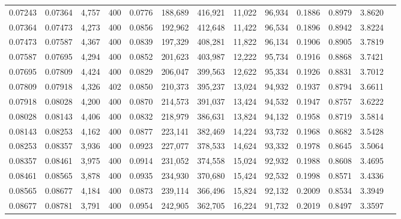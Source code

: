 \begin{tabular}{rrrrrrrrrrrrr}
0.07243 & 0.07364 &  4,757 & 400 &                                     0.0776 & 188,689 & 416,921 &  11,022 &  96,934 & 0.1886 & 0.8979 & 3.8620 \\
0.07364 & 0.07473 &  4,273 & 400 &                                     0.0856 & 192,962 & 412,648 &  11,422 &  96,534 & 0.1896 & 0.8942 & 3.8224 \\
0.07473 & 0.07587 &  4,367 & 400 &                                     0.0839 & 197,329 & 408,281 &  11,822 &  96,134 & 0.1906 & 0.8905 & 3.7819 \\
0.07587 & 0.07695 &  4,294 & 400 &                                     0.0852 & 201,623 & 403,987 &  12,222 &  95,734 & 0.1916 & 0.8868 & 3.7421 \\
0.07695 & 0.07809 &  4,424 & 400 &                                     0.0829 & 206,047 & 399,563 &  12,622 &  95,334 & 0.1926 & 0.8831 & 3.7012 \\
0.07809 & 0.07918 &  4,326 & 402 &                                     0.0850 & 210,373 & 395,237 &  13,024 &  94,932 & 0.1937 & 0.8794 & 3.6611 \\
0.07918 & 0.08028 &  4,200 & 400 &                                     0.0870 & 214,573 & 391,037 &  13,424 &  94,532 & 0.1947 & 0.8757 & 3.6222 \\
0.08028 & 0.08143 &  4,406 & 400 &                                     0.0832 & 218,979 & 386,631 &  13,824 &  94,132 & 0.1958 & 0.8719 & 3.5814 \\
0.08143 & 0.08253 &  4,162 & 400 &                                     0.0877 & 223,141 & 382,469 &  14,224 &  93,732 & 0.1968 & 0.8682 & 3.5428 \\
0.08253 & 0.08357 &  3,936 & 400 &                                     0.0923 & 227,077 & 378,533 &  14,624 &  93,332 & 0.1978 & 0.8645 & 3.5064 \\
0.08357 & 0.08461 &  3,975 & 400 &                                     0.0914 & 231,052 & 374,558 &  15,024 &  92,932 & 0.1988 & 0.8608 & 3.4695 \\
0.08461 & 0.08565 &  3,878 & 400 &                                     0.0935 & 234,930 & 370,680 &  15,424 &  92,532 & 0.1998 & 0.8571 & 3.4336 \\
0.08565 & 0.08677 &  4,184 & 400 &                                     0.0873 & 239,114 & 366,496 &  15,824 &  92,132 & 0.2009 & 0.8534 & 3.3949 \\
0.08677 & 0.08781 &  3,791 & 400 &                                     0.0954 & 242,905 & 362,705 &  16,224 &  91,732 & 0.2019 & 0.8497 & 3.3597 \\

\end{tabular}
